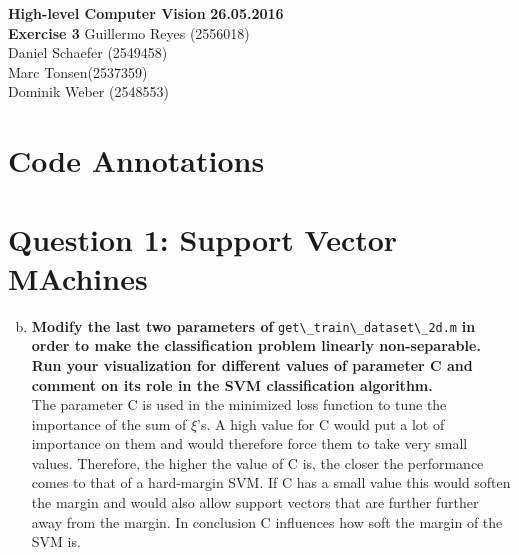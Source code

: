 \documentclass[12pt]{article}
\begin{document}

\noindent
{\Large \textbf{High-level Computer Vision}} \hfill \textbf{26.05.2016}\\
{\Large \textbf{Exercise 3}} 
\raggedleft \hfill Guillermo Reyes (2556018)\\
\hfill Daniel Schaefer (2549458)\\
\hfill Marc Tonsen(2537359)\\
\hfill Dominik Weber (2548553)\\

\raggedright


\section*{Code Annotations}




\section*{Question 1: Support Vector MAchines}

\begin{enumerate}[a)]
	\setcounter{enumi}{1}
	\item 	
        \textbf{Modify the last two parameters of} \verb!get\_train\_dataset\_2d.m! \textbf{in order to make the classification problem linearly non-separable. Run your visualization for different values of parameter C and comment on its role in the SVM classification algorithm.}\\
		The parameter C is used in the minimized loss function to tune the importance of the sum of $\xi$'s. A high value for C would put a lot of importance on them and would therefore force them to take very small values. Therefore, the higher the value of C is, the closer the performance comes to that of a hard-margin SVM. If C has a small value this would soften the margin and would also allow support vectors that are further further away from the margin. In conclusion C influences how soft the margin of the SVM is.
\end{enumerate}
\end{document}
